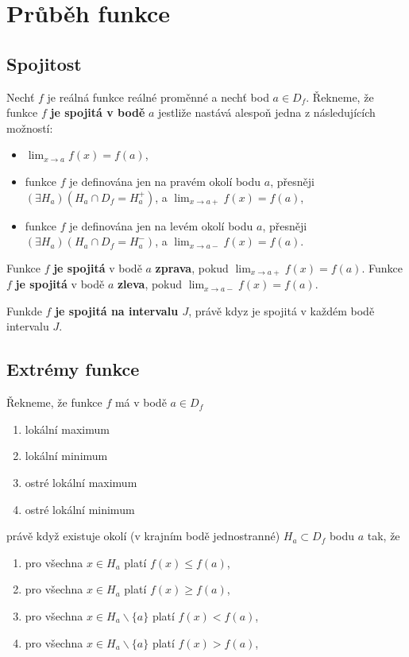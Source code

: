 \documentclass{szzclass}
\begin{document}
\newpage

\section{Průběh funkce}

\subsection{Spojitost}

Nechť $f$ je reálná funkce reálné proměnné a nechť bod
$a \in D_f$. Řekneme, že funkce $f$ \textbf{je spojitá v bodě}
$a$ jestliže nastává alespoň jedna z následujících možností:

\begin{itemize}
    \item $\displaystyle \lim_{x\to a} f(x) = f(a)$,
    \item funkce $f$ je definována jen na pravém okolí bodu $a$, přesněji $(\exists H_a)(H_a \cap D_f = H^+_a)$, a $\displaystyle \lim_{x\to a+} f(x) = f(a)$,
    \item funkce $f$ je definována jen na levém okolí bodu $a$, přesněji $(\exists H_a)(H_a \cap D_f = H^-_a)$, a $\displaystyle \lim_{x\to a-} f(x) = f(a)$.
\end{itemize}

Funkce $f$ \textbf{je spojitá} v bodě $a$ \textbf{zprava}, pokud $\displaystyle\lim_{x\to a+} f(x) = f(a)$.\newline
Funkce $f$ \textbf{je spojitá} v bodě $a$ \textbf{zleva}, pokud $\displaystyle\lim_{x\to a-} f(x) = f(a)$.

Funkde $f$ \textbf{je spojitá na intervalu $J$}, právě kdyz je spojitá v každém bodě intervalu \textbf{$J$}.

\subsection{Extrémy funkce}

Řekneme, že funkce $f$ má v bodě $a \in D_f$
\begin{enumerate}
    \item lokální maximum
    \item lokální minimum
    \item ostré lokální maximum
    \item ostré lokální minimum
\end{enumerate}
právě když existuje okolí (v krajním bodě jednostranné) $H_a \subset D_f$ bodu $a$ tak, že
\begin{enumerate}
    \item pro všechna $x \in H_a$ platí $f(x) \leq f(a)$,
    \item pro všechna $x \in H_a$ platí $f(x) \geq f(a)$, 
    \item pro všechna $x \in H_a \backslash \{a\}$ platí $f(x) < f(a)$,
    \item pro všechna $x \in H_a \backslash \{a\}$ platí $f(x) > f(a)$,
\end{enumerate}
\end{document}
